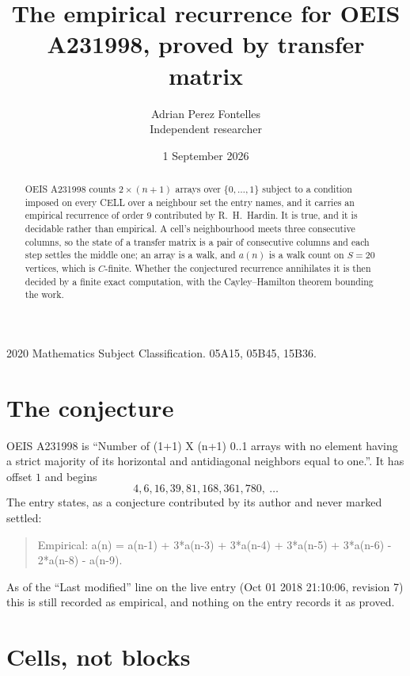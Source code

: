 \documentclass[11pt,a4paper]{article}
\title{The empirical recurrence for OEIS A231998, proved by transfer matrix}
\author{Adrian Perez Fontelles\\ \small Independent researcher}
\date{1 September 2026}
\theoremstyle{plain}
\theoremstyle{definition}
\begin{document}
\maketitle

\begin{abstract}
OEIS A231998 counts $2\times(n+1)$ arrays over $\{0,\dots,1\}$ subject to a condition imposed on
every CELL over a neighbour set the entry names, and it carries an empirical recurrence of
order $9$ contributed by R.~H.~Hardin. It is true, and it is decidable rather than
empirical. A cell's neighbourhood meets three consecutive columns, so the state of a transfer
matrix is a pair of consecutive columns and each step settles the middle one; an array is a
walk, and $a(n)$ is a walk count on $S=20$ vertices, which is $C$-finite. Whether the
conjectured recurrence annihilates it is then decided by a finite exact computation, with the
Cayley--Hamilton theorem bounding the work.
\end{abstract}

\noindent\small 2020 Mathematics Subject Classification. 05A15, 05B45, 15B36.\normalsize

\section{The conjecture}

OEIS A231998 is ``Number of (1+1) X (n+1) 0..1 arrays with no element having a strict majority of its horizontal and antidiagonal neighbors equal to one.''. It has offset $1$ and begins
\[
4, 6, 16, 39, 81, 168, 361, 780,\ \dots
\]
The entry states, as a conjecture contributed by its author and never marked settled:
\begin{quote}
Empirical: a(n) = a(n-1) + 3*a(n-3) + 3*a(n-4) + 3*a(n-5) + 3*a(n-6) - 2*a(n-8) - a(n-9).
\end{quote}
As of the ``Last modified'' line on the live entry (Oct 01 2018 21:10:06, revision 7) this is still
recorded as empirical, and nothing on the entry records it as proved.

\section{Cells, not blocks}
\end{document}
